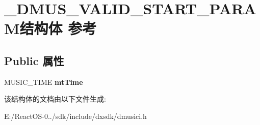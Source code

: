 \hypertarget{struct___d_m_u_s___v_a_l_i_d___s_t_a_r_t___p_a_r_a_m}{}\section{\+\_\+\+D\+M\+U\+S\+\_\+\+V\+A\+L\+I\+D\+\_\+\+S\+T\+A\+R\+T\+\_\+\+P\+A\+R\+A\+M结构体 参考}
\label{struct___d_m_u_s___v_a_l_i_d___s_t_a_r_t___p_a_r_a_m}
\subsection*{Public 属性}
\begin{DoxyCompactItemize}
\item 
\mbox{\label{struct___d_m_u_s___v_a_l_i_d___s_t_a_r_t___p_a_r_a_m_a93965b8df41886f1f2e14b79dcc2b9f0}} 
M\+U\+S\+I\+C\+\_\+\+T\+I\+ME {\bfseries mt\+Time}
\end{DoxyCompactItemize}


该结构体的文档由以下文件生成\+:\begin{DoxyCompactItemize}
\item 
E\+:/\+React\+O\+S-\/0../sdk/include/dxsdk/dmusici.\+h\end{DoxyCompactItemize}
